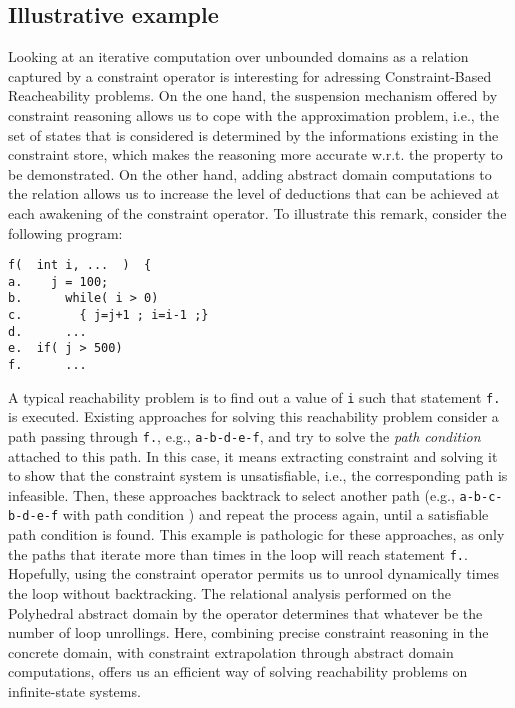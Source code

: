 \documentclass[submission,copyright,creativecommons]{eptcs}
\begin{document}
\subsection{Illustrative example}

Looking at an iterative computation over unbounded domains as a relation captured by a  constraint operator is 
interesting for adressing Constraint-Based Reacheability problems. On the one hand, the suspension mechanism offered by constraint reasoning allows us 
to cope with the approximation problem, i.e., the set of states that is considered is determined by the informations existing 
in the constraint store, which makes the reasoning more accurate w.r.t. the property to be demonstrated. On the other hand, adding abstract domain 
computations to the  relation allows us to increase the level of deductions that can be achieved at each awakening of the  constraint operator. 
To illustrate this remark, consider the following  program:
\begin{verbatim}
f(  int i, ...  )  {
a.    j = 100;
b.      while( i > 0)
c.        { j=j+1 ; i=i-1 ;}
d.      ... 
e.	if( j > 500)
f.	    ...
\end{verbatim}
\noindent
A typical reachability problem is to find out a value of {\tt i} such that statement {\tt f.} is executed. Existing approaches for solving this reachability problem consider a path passing through {\tt f.}, e.g., {\tt a-b-d-e-f}, and try to solve the {\it path condition} attached to this path. In this case, it means extracting constraint  and solving it to show that the constraint system is unsatisfiable, i.e., the corresponding path is infeasible. Then, these approaches backtrack to select another path (e.g., {\tt a-b-c-b-d-e-f} with path condition 
) and repeat the process again, until a satisfiable path condition is found. This example is pathologic for these approaches, as only the paths that iterate more than  times in the loop will reach statement {\tt f.}. Hopefully, using the constraint operator  permits us to unrool dynamically  times the loop without backtracking. The relational analysis performed on the Polyhedral abstract domain by the  operator determines that  whatever be the number of loop unrollings. Here, combining precise constraint reasoning in the concrete domain, with constraint extrapolation through abstract domain computations, offers us an efficient way of solving reachability problems on infinite-state systems.   
\end{document}
